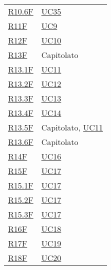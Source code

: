 \begin{center}
\begin{longtable}[!h]{p{50px} p{50px}}
        \hyperref[tab:RequisitiFunzionali]{R10.6F} & \hyperref[sec:UC35]{UC35}                      \\
        \hyperref[tab:RequisitiFunzionali]{R11F}   & \hyperref[sec:UC9]{UC9}                        \\
        \hyperref[tab:RequisitiFunzionali]{R12F}   & \hyperref[sec:UC10]{UC10}                      \\
        \hyperref[tab:RequisitiFunzionali]{R13F}   & Capitolato                                     \\
        \hyperref[tab:RequisitiFunzionali]{R13.1F} & \hyperref[sec:UC11]{UC11}                      \\
        \hyperref[tab:RequisitiFunzionali]{R13.2F} & \hyperref[sec:UC12]{UC12}                      \\
        \hyperref[tab:RequisitiFunzionali]{R13.3F} & \hyperref[sec:UC13]{UC13}                      \\
        \hyperref[tab:RequisitiFunzionali]{R13.4F} & \hyperref[sec:UC14]{UC14}                      \\
        \hyperref[tab:RequisitiFunzionali]{R13.5F} & Capitolato, \newline \hyperref[sec:UC11]{UC11} \\
        \hyperref[tab:RequisitiFunzionali]{R13.6F} & Capitolato                                     \\
        \hyperref[tab:RequisitiFunzionali]{R14F}   & \hyperref[sec:UC16]{UC16}                      \\
        \hyperref[tab:RequisitiFunzionali]{R15F}   & \hyperref[sec:UC17]{UC17}                      \\
        \hyperref[tab:RequisitiFunzionali]{R15.1F} & \hyperref[sec:UC17]{UC17}                      \\
        \hyperref[tab:RequisitiFunzionali]{R15.2F} & \hyperref[sec:UC17]{UC17}                      \\
        \hyperref[tab:RequisitiFunzionali]{R15.3F} & \hyperref[sec:UC17]{UC17}                      \\
        \hyperref[tab:RequisitiFunzionali]{R16F}   & \hyperref[sec:UC18]{UC18}                      \\
        \hyperref[tab:RequisitiFunzionali]{R17F}   & \hyperref[sec:UC19]{UC19}                      \\
        \hyperref[tab:RequisitiFunzionali]{R18F}   & \hyperref[sec:UC20]{UC20}                      \\

\end{longtable}
\end{center}
